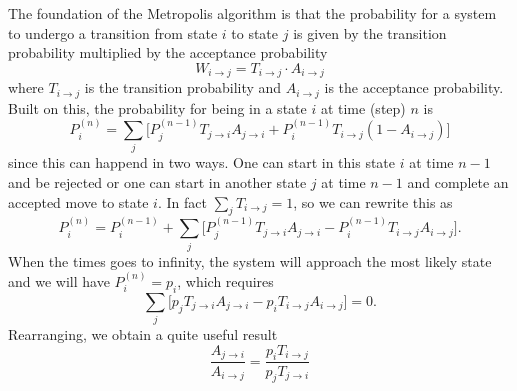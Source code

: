 \documentclass[norsk,a4paper,12pt]{article}
\begin{document}
The foundation of the Metropolis algorithm is that the probability for a system to undergo a transition from state $i$ to state $j$ is given by the transition probability multiplied by the acceptance probability
\begin{equation}
W_{i\rightarrow j} = T_{i \rightarrow j}\cdot A_{i \rightarrow j}
\end{equation}
where $T_{i \rightarrow j}$ is the transition probability and $A_{i \rightarrow j}$ is the acceptance probability. Built on this, the probability for being in a state $i$ at time (step) $n$ is
\begin{equation}
P_i^{(n)} = \sum_j\bigg[P_j^{(n-1)}T_{j \rightarrow i}A_{j \rightarrow i} + P_i^{(n-1)}T_{i \rightarrow j}(1-A_{i \rightarrow j})\bigg]
\end{equation}
since this can happend in two ways. One can start in this state $i$ at time $n-1$ and be rejected or one can start in another state $j$ at time $n-1$ and complete an accepted move to state $i$. In fact $\sum_j T_{i \rightarrow j} =1$, so we can rewrite this as 
\begin{equation}
P_i^{(n)} = P_i^{(n-1)} + \sum_j\bigg[P_j^{(n-1)}T_{j \rightarrow i}A_{j \rightarrow i} - P_i^{(n-1)}T_{i \rightarrow j}A_{i \rightarrow j}\bigg].
\end{equation}
When the times goes to infinity, the system will approach the most likely state and we will have $P_i^{(n)} = p_i$, which requires
\begin{equation}
\sum_j\bigg[p_jT_{j \rightarrow i}A_{j \rightarrow i} - p_iT_{i \rightarrow j}A_{i \rightarrow j}\bigg]=0.
\end{equation}
Rearranging, we obtain a quite useful result
\begin{equation}
\frac{A_{j\rightarrow i}}{A_{i\rightarrow j}}=\frac{p_iT_{i\rightarrow j}}{p_jT_{j\rightarrow i}}
\end{equation}
\end{document}
